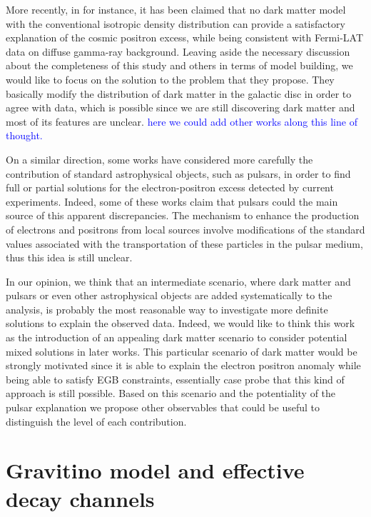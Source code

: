 \documentclass[a4paper,11pt]{article}
\newcommand*{\blue}{\textcolor{blue}}
\begin{document}
More recently, in \cite{Belotsky:2016tja} for instance, it has been claimed that no dark matter model with the conventional isotropic density distribution can provide a satisfactory explanation of the cosmic positron excess, while being consistent with Fermi-LAT data on diffuse gamma-ray background. Leaving aside the necessary discussion about the completeness of this study and others in terms of model building, we would like to focus on the solution to the problem that they propose. They basically modify the distribution of dark matter in the galactic disc in order to agree with data, which is possible since we are still discovering dark matter and most of its features are unclear. \blue{here we could add other works along this line of thought.}

On a similar direction, some works have considered more carefully the contribution of standard astrophysical objects, such as pulsars, in order
to find full or partial solutions for the electron-positron excess detected by current experiments. Indeed, some of these works claim that pulsars could the main source of this apparent discrepancies. The mechanism to enhance the production of electrons and positrons from local sources involve modifications of the standard values associated with the transportation of these particles in the pulsar medium, thus this idea is still unclear. 

In our opinion, we think that an intermediate scenario, where dark matter and pulsars or even other astrophysical objects are added systematically to the analysis, is probably the most reasonable way to investigate more definite solutions to explain the observed data. Indeed, we would like to think this work as the introduction of an appealing dark matter scenario to consider potential mixed solutions in later works. This particular scenario of dark matter would be strongly motivated since it is able to explain the electron positron anomaly while being able to satisfy EGB constraints, essentially case probe that this kind of approach is still possible. Based on this scenario and the potentiality of the pulsar explanation we propose other observables that could be useful to distinguish the level of each contribution. 

 
\section{Gravitino model and effective decay channels}
\label{gdecay}
\end{document}
